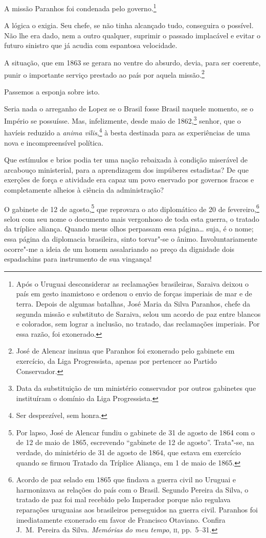  A missão Paranhos foi condenada pelo
governo.\footnote{ Após o Uruguai desconsiderar as reclamações brasileiras, Saraiva 
deixou o país em gesto inamistoso e ordenou o envio de forças imperiais de mar e de terra. 
Depois de algumas batalhas, José Maria da Silva Paranhos, chefe da segunda missão e substituto 
de Saraiva, selou um acordo de paz entre blancos e colorados, sem lograr a inclusão, no tratado, 
das reclamações imperiais. Por essa razão, foi exonerado.}

 A lógica o exigia. Seu chefe, se não tinha alcançado tudo, conseguira o
possível. Não lhe era dado, nem a outro qualquer, suprimir o passado
implacável e evitar o futuro sinistro que já acudia com espantosa velocidade.

 A situação, que em 1863 se gerara no ventre do absurdo, devia, para ser
coerente, punir o importante serviço prestado ao país por aquela
missão.\footnote{ José de Alencar insinua que Paranhos foi exonerado pelo gabinete em exercício,
da Liga Progressista, apenas por pertencer ao Partido Conservador.}
 
 Passemos a esponja sobre isto.

 Seria nada o arreganho de Lopez se o Brasil fosse Brasil naquele
momento, se o Império se possuísse. Mas, infelizmente, desde maio de
1862,\footnote{ Data da substituição de um ministério conservador por outros gabinetes que
instituíram o domínio da Liga Progressista.}
 senhor, que o havíeis reduzido a \textit{anima vilis},\footnote{ Ser
desprezível, sem honra.} à besta destinada para as experiências 
de uma nova e incompreensível política.

 Que estímulos e brios podia ter uma nação rebaixada à condição
miserável de arcabouço ministerial, para a aprendizagem dos impúberes
estadistas? De que exerções de força e atividade era capaz um povo
enervado por governos fracos e completamente alheios à ciência da administração?

 O gabinete de 12 de agosto,\footnote{ \label{gale}Por lapso, José de Alencar fundiu o gabinete 
de 31 de agosto de 1864 com o
de 12 de maio de 1865, escrevendo ``gabinete de 12 de agosto''.
Trata"-se, na verdade, do ministério de 31 de agosto de 1864, que
estava em exercício quando se firmou Tratado da Tríplice Aliança, em 1
de maio de 1865.} que reprovara o ato diplomático de 20 de
fevereiro,\footnote{ Acordo de paz selado em 1865 que findava a guerra civil no Uruguai e
harmonizava as relações do país com o Brasil. Segundo Pereira da Silva,
o tratado de paz foi mal recebido pelo Imperador porque não regulava
reparações uruguaias aos brasileiros perseguidos na guerra civil.
Paranhos foi imediatamente exonerado em favor de Francisco Otaviano.
Confira J.~M.~Pereira da Silva. \textit{Memórias do meu tempo}, \textsc{ii}, pp.~5--31.}
 selou com seu nome o documento mais vergonhoso de toda esta guerra, o
tratado da tríplice aliança. Quando meus olhos perpassam essa página\ldots{}
suja, é o nome; essa página da diplomacia brasileira, sinto torvar"-se
o ânimo. Involuntariamente ocorre"-me a ideia de um homem assalariando
ao preço da dignidade dois espadachins para instrumento de sua vingança!

